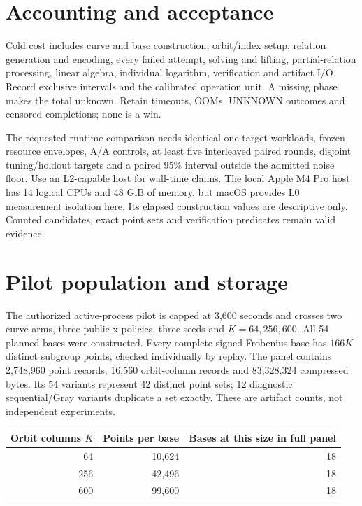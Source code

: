\documentclass[11pt]{article}
\begin{document}
\section*{Accounting and acceptance}
Cold cost includes curve and base construction, orbit/index setup, relation generation and encoding, every failed attempt, solving and lifting, partial-relation processing, linear algebra, individual logarithm, verification and artifact I/O. Record exclusive intervals and the calibrated operation unit. A missing phase makes the total unknown. Retain timeouts, OOMs, UNKNOWN outcomes and censored completions; none is a win.

The requested runtime comparison needs identical one-target workloads, frozen resource envelopes, A/A controls, at least five interleaved paired rounds, disjoint tuning/holdout targets and a paired 95\% interval outside the admitted noise floor. Use an L2-capable host for wall-time claims. The local Apple M4 Pro host has 14 logical CPUs and 48 GiB of memory, but macOS provides L0 measurement isolation here. Its elapsed construction values are descriptive only. Counted candidates, exact point sets and verification predicates remain valid evidence.

\section*{Pilot population and storage}
The authorized active-process pilot is capped at 3,600 seconds and crosses two curve arms, three public-x policies, three seeds and $K=64,256,600$. All 54 planned bases were constructed. Every complete signed-Frobenius base has $166K$ distinct subgroup points, checked individually by replay. The panel contains 2,748,960 point records, 16,560 orbit-column records and 83,328,324 compressed bytes. Its 54 variants represent 42 distinct point sets; 12 diagnostic sequential/Gray variants duplicate a set exactly. These are artifact counts, not independent experiments.

\begin{center}
\begin{tabular}{rrr}
\toprule
Orbit columns $K$ & Points per base & Bases at this size in full panel\\
\midrule
64 & 10,624 & 18\\
256 & 42,496 & 18\\
600 & 99,600 & 18\\
\bottomrule
\end{tabular}
\end{center}
\end{document}
